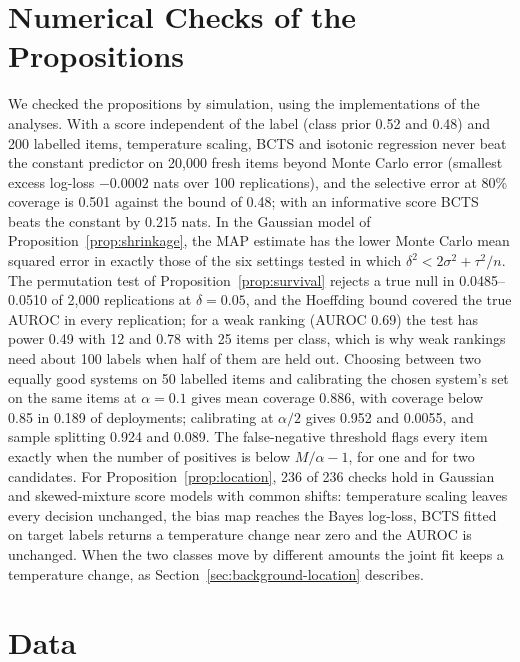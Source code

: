 \section{Numerical Checks of the Propositions}
\label{sec:appendix-simulation}
We checked the propositions by simulation, using the implementations of the analyses. With a score independent of the
label (class prior 0.52 and 0.48) and 200 labelled items, temperature scaling, BCTS and isotonic regression never beat
the constant predictor on 20{,}000 fresh items beyond Monte Carlo error (smallest excess log-loss $-0.0002$ nats over 100
replications), and the selective error at 80\% coverage is 0.501 against the bound of 0.48; with an informative score
BCTS beats the constant by 0.215 nats. In the Gaussian model of Proposition~\ref{prop:shrinkage}, the MAP estimate has
the lower Monte Carlo mean squared error in exactly those of the six settings tested in which
$\delta^2 < 2\sigma^2 + \tau^2/n$. The permutation test of Proposition~\ref{prop:survival} rejects a true null in 0.0485--0.0510 of 2{,}000
replications at $\delta = 0.05$, and the Hoeffding bound covered the true AUROC in every replication; for a weak
ranking (AUROC 0.69) the test has power 0.49 with 12 and 0.78 with 25 items per class, which is why weak rankings need
about 100 labels when half of them are held out. Choosing between two equally good systems on 50 labelled items and
calibrating the chosen system's set on the same items at $\alpha = 0.1$ gives mean coverage 0.886, with coverage below
0.85 in 0.189 of deployments; calibrating at $\alpha/2$ gives 0.952 and 0.0055, and sample splitting 0.924 and 0.089.
The false-negative threshold flags every item exactly when the number of positives is below $M/\alpha - 1$, for one
and for two candidates. For Proposition~\ref{prop:location}, 236 of 236 checks hold in Gaussian and skewed-mixture
score models with common shifts: temperature scaling leaves every decision unchanged, the bias map reaches the Bayes
log-loss, BCTS fitted on target labels returns a temperature change near zero and the AUROC is unchanged. When the two
classes move by different amounts the joint fit keeps a temperature change, as Section~\ref{sec:background-location}
describes.

\section{Data}
\label{sec:appendix-data}


